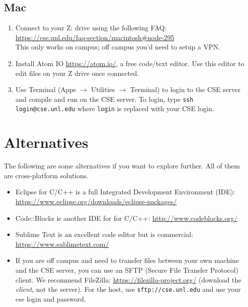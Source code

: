 \documentclass[12pt]{scrartcl}
\begin{document}
\subsection*{Mac}

\begin{enumerate}
  \item Connect to your Z: drive using the following FAQ: \\
  \url{https://cse.unl.edu/faq-section/macintosh#node-295}\\
  This only works on campus; off campus you'd need to setup a VPN.
  \item Install Atom IO \url{https://atom.io/}, a free code/text 
  editor.  Use this editor to edit files on your Z drive once connected.
  \item Use Terminal (Apps $\rightarrow$ Utilities $\rightarrow$ Terminal) to
  login to the CSE server and compile and run on the CSE server.  To login, type
  \texttt{ssh login@cse.unl.edu} where \texttt{login} 
  is replaced with your CSE login.
\end{enumerate}
  
\section*{Alternatives}

The following are some alternatives if you want to explore further.
All of them are cross-platform solutions.
\begin{itemize} 
  \item Eclipse for C/C++ is a full Integrated Development Environment (IDE):
  \url{https://www.eclipse.org/downloads/eclipse-packages/}
  \item Code::Blocks is another IDE for for C/C++: \url{http://www.codeblocks.org/}
  \item Sublime Text is an excellent code editor but is commercial: \url{https://www.sublimetext.com/}
  \item If you are off campus and need to transfer files between your 
  own machine and the CSE server, you can use an SFTP (Secure File Transfer
  Protocol) client.  We recommend FileZilla: \url{https://filezilla-project.org/}
  (download the \emph{client}, not the server).  For the host, use 
  \texttt{sftp://cse.unl.edu} and use your cse login and password.
\end{itemize}


  
\end{document}
